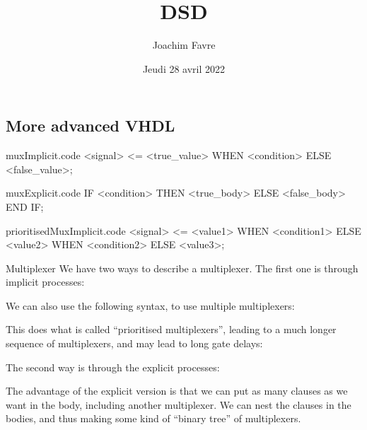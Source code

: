 \documentclass[a4paper]{article}
\title{DSD}
\author{Joachim Favre}
\date{Jeudi 28 avril 2022}
\begin{document}
\maketitle


\subsection{More advanced VHDL}

\begin{filecontents*}[overwrite]{muxImplicit.code}
<signal> <= <true_value> WHEN <condition> ELSE <false_value>;
\end{filecontents*}

\begin{filecontents*}[overwrite]{muxExplicit.code}
IF <condition> 
    THEN <true_body>
    ELSE <false_body>
END IF;
\end{filecontents*}

\begin{filecontents*}[overwrite]{prioritisedMuxImplicit.code}
<signal> <= <value1> WHEN <condition1>
            ELSE <value2> WHEN <condition2>
            ELSE <value3>;
\end{filecontents*}


\begin{parag}{Multiplexer}
    We have two ways to describe a multiplexer. The first one is through implicit processes:
    
    We can also use the following syntax, to use multiple multiplexers: 
    
    This does what is called ``prioritised multiplexers'', leading to a much longer sequence of multiplexers, and may lead to long gate delays:

    The second way is through the explicit processes:
    
    The advantage of the explicit version is that we can put as many clauses as we want in the body, including another multiplexer. We can nest the clauses in the bodies, and thus making some kind of ``binary tree'' of multiplexers.
\end{parag}
\end{document}
